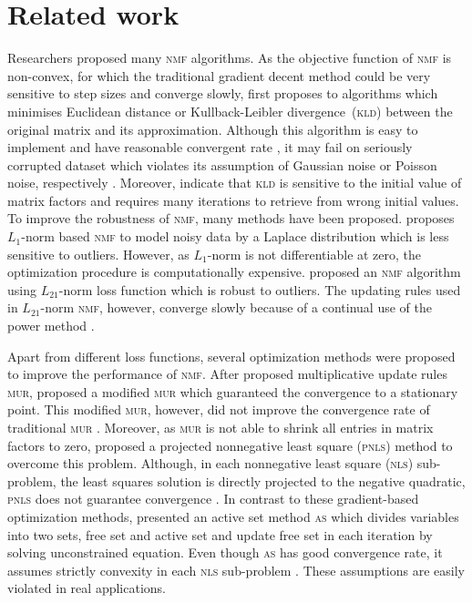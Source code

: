 \section{Related work}
Researchers proposed many \textsc{nmf} algorithms. As the objective function of \textsc{nmf} is non-convex, for which the traditional gradient decent method could be very sensitive to step sizes and converge slowly, \citet{lee2001algorithms} first proposes to algorithms which minimises Euclidean distance or Kullback-Leibler divergence~(\textsc{kld}) between the original matrix and its approximation. Although this algorithm is easy to implement and have reasonable convergent rate \citep{lee2001algorithms}, it may fail on seriously corrupted dataset which violates its assumption of Gaussian noise or Poisson noise, respectively \citep{guan2017truncated}. Moreover, \citet{yang2011kullback} indicate that \textsc{kld} is sensitive to the initial value of matrix factors and requires many iterations to retrieve from wrong initial values.  To improve the robustness of \textsc{nmf}, many methods have been proposed. \citet{lam2008non} proposes ${L_1}$-norm based \textsc{nmf} to model noisy data by a Laplace distribution which is less sensitive to outliers. However, as $L_1$-norm is not differentiable at zero, the optimization procedure is computationally expensive. \citet{kong2011robust} proposed an \textsc{nmf} algorithm using $L_{21}$-norm loss function which is robust to outliers. The updating rules used in $L_{21}$-norm \textsc{nmf}, however, converge slowly because of a continual use of the power method \citep{guan2017truncated}.

Apart from different loss functions, several optimization methods were proposed to improve the performance of \textsc{nmf}. After \citet{lee2001algorithms} proposed  multiplicative update rules \textsc{mur}, \citet{ lin2007convergence} proposed a modified \textsc{mur} which guaranteed the convergence to a stationary point. This modified \textsc{mur}, however, did not improve the convergence rate of traditional \textsc{mur} \citep{guan2012nenmf}. Moreover, as \textsc{mur} is not able to shrink all entries in matrix factors to zero, \citet{berry2007algorithms} proposed a projected nonnegative least square (\textsc{pnls}) method to overcome this problem. Although, in each nonnegative least square (\textsc{nls}) sub-problem, the least squares solution is directly projected to the negative quadratic, \textsc{pnls} does not guarantee convergence \citep{guan2012nenmf}. In contrast to these gradient-based optimization methods, \citet{kim2008nonnegative} presented an active set method \textsc{as} which divides variables into two sets, free set and active set and update free set in each iteration by solving unconstrained equation. Even though \textsc{as} has good convergence rate, it assumes strictly convexity in each \textsc{nls} sub-problem \citep{kim2008nonnegative}. These assumptions are easily violated in real applications.
